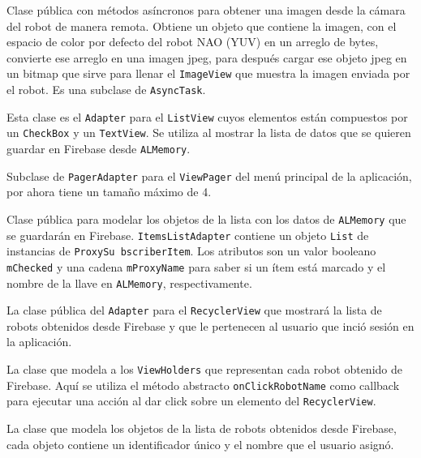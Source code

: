 Clase pública con métodos asíncronos para obtener una imagen desde la cámara del robot de manera remota.  Obtiene un objeto que contiene la imagen, con el espacio de color por defecto del robot NAO (YUV) en un arreglo de bytes, convierte ese arreglo en una imagen jpeg, para después cargar ese objeto jpeg en un bitmap que sirve para llenar el \texttt{ImageView} que muestra la imagen enviada por el robot. Es una subclase
de \texttt{AsyncTask}.


Esta clase es el \texttt{Adapter} para el \texttt{ListView} cuyos elementos 
están compuestos por un \texttt{CheckBox} y un \texttt{TextView}. Se 
utiliza al mostrar la lista de datos que se quieren guardar en 
Firebase desde \texttt{ALMemory}.


Subclase de \texttt{PagerAdapter} para el \texttt{ViewPager} del menú
principal de la aplicación, por ahora tiene un tamaño máximo de 4. 


Clase pública para modelar los objetos de la lista con los datos de \texttt{ALMemory} que se guardarán en Firebase. \texttt{ItemsListAdapter} contiene un objeto \texttt{List} de
instancias de \texttt{ProxySu	bscriberItem}. Los
atributos son un  valor booleano \texttt{mChecked} y una cadena \texttt{mProxyName} para saber si un ítem está marcado y el nombre
de la llave en \texttt{ALMemory}, respectivamente.


La clase pública del \texttt{Adapter} para el \texttt{RecyclerView} que mostrará la lista de robots obtenidos desde Firebase y que le pertenecen al
usuario que inció sesión en la aplicación.


La clase que modela a los \texttt{ViewHolders} que representan cada robot obtenido de Firebase.
Aquí se utiliza el método abstracto \texttt{onClickRobotName} como callback para ejecutar una acción al dar click sobre un elemento del \texttt{RecyclerView}.


La clase que modela los objetos de la lista de robots obtenidos desde Firebase, cada objeto contiene un identificador único y el nombre que el usuario asignó.

